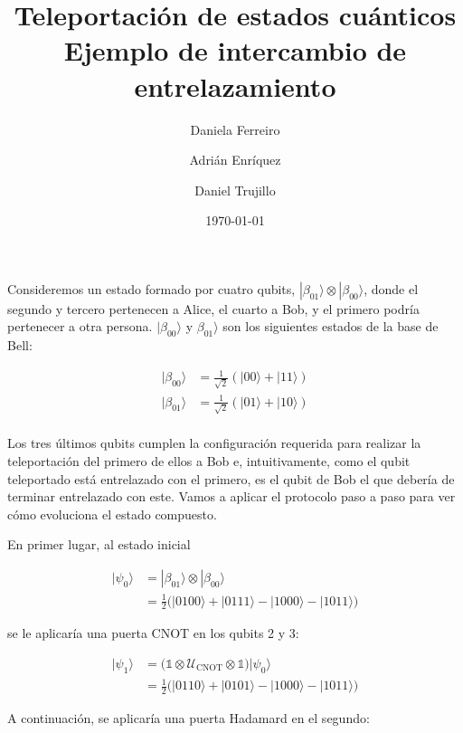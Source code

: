 \documentclass{article}
\title{%
  Teleportación de estados cuánticos \\ 
  \large Ejemplo de intercambio de entrelazamiento
}
\author{
  Daniela Ferreiro \and 
  Adrián Enríquez \and 
  Daniel Trujillo
}
\date{\today}
\begin{document}
\maketitle

Consideremos un estado formado por cuatro qubits,
$|\beta_{01}\rangle \otimes |\beta_{00}\rangle$, donde el segundo
y tercero pertenecen a Alice, el cuarto a Bob, y el primero podría
pertenecer a otra persona. $|\beta_{00}\rangle$
y $\beta_{01}\rangle$ son los siguientes estados de la base de Bell:

\begin{align*}
  |\beta_{00}\rangle &= 
    \frac{1}{\sqrt{2}}(|00\rangle + |11\rangle) \\
  |\beta_{01}\rangle &= 
    \frac{1}{\sqrt{2}}(|01\rangle + |10\rangle) \\
\end{align*}

Los tres últimos qubits cumplen la configuración requerida para
realizar la teleportación del primero de ellos a Bob e,
intuitivamente, como el qubit teleportado está entrelazado con el
primero, es el qubit de Bob el que debería de terminar entrelazado
con este. Vamos a aplicar el protocolo paso a paso para ver cómo
evoluciona el estado compuesto.

En primer lugar, al estado inicial

\begin{align*}
  |\psi_0\rangle &= |\beta_{01}\rangle \otimes |\beta_{00}\rangle \\ 
         &= \frac{1}{2}\Big(
            |0100\rangle + |0111\rangle -|1000\rangle - |1011\rangle
         \Big)
\end{align*}

se le aplicaría una puerta CNOT en los qubits 2 y 3:

\begin{align*}
  |\psi_1\rangle 
        &= \Big(
          \mathbb{1} 
          \otimes \mathcal{U} _\text{CNOT}
          \otimes \mathbb{1}
          \Big)|\psi_0\rangle \\ 
        &= \frac{1}{2}\Big(
          |0110\rangle + |0101\rangle -|1000\rangle - |1011\rangle
        \Big)
\end{align*}

A continuación, se aplicaría una puerta Hadamard en el segundo:
\end{document}
